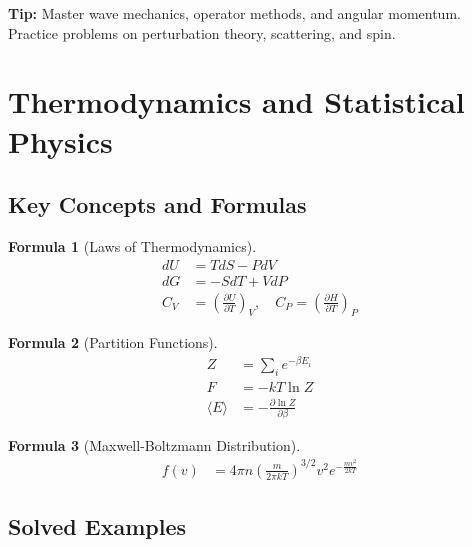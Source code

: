 \documentclass[12pt,a4paper]{article}
\newtheorem{formula}{Formula}[section]
\newcommand{\tip}[1]{\textcolor{green!60!black}{\textbf{Tip:} #1}}
\begin{document}
\tip{Master wave mechanics, operator methods, and angular momentum. Practice problems on perturbation theory, scattering, and spin.}

\section{Thermodynamics and Statistical Physics}

\subsection{Key Concepts and Formulas}

\begin{formula}[Laws of Thermodynamics]
\begin{align}
dU &= TdS - PdV\\
dG &= -SdT + VdP\\
C_V &= \left(\frac{\partial U}{\partial T}\right)_V, \quad C_P = \left(\frac{\partial H}{\partial T}\right)_P
\end{align}
\end{formula}

\begin{formula}[Partition Functions]
\begin{align}
Z &= \sum_i e^{-\beta E_i}\\
F &= -kT\ln Z\\
\langle E \rangle &= -\frac{\partial \ln Z}{\partial \beta}
\end{align}
\end{formula}

\begin{formula}[Maxwell-Boltzmann Distribution]
\begin{align}
f(v) &= 4\pi n\left(\frac{m}{2\pi kT}\right)^{3/2} v^2 e^{-\frac{mv^2}{2kT}}
\end{align}
\end{formula}

\subsection{Solved Examples}
\end{document}
